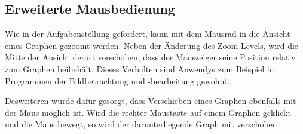 \subsection{Erweiterte Mausbedienung}
Wie in der Aufgabenstellung gefordert, kann mit dem Mausrad in die Ansicht eines
Graphen gezoomt werden. Neben der Änderung des Zoom-Levels, wird die Mitte der
Ansicht derart verschoben, dass der Mauszeiger seine Position relativ zum
Graphen beibehält. Dieses Verhalten sind Anwendys zum Beispiel in Programmen der
Bildbetrachtung und -bearbeitung gewohnt.

Desweiteren wurde dafür gesorgt, dass Verschieben eines Graphen ebenfalls mit
der Maus möglich ist. Wird die rechter Maustaste auf einem Graphen geklickt und
die Maus bewegt, so wird der darunterliegende Graph mit verschoben.